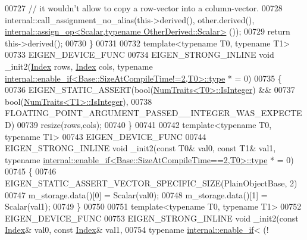 \begin{DoxyCode}
00727       \textcolor{comment}{// it wouldn't allow to copy a row-vector into a column-vector.}
00728       internal::call\_assignment\_no\_alias(this->derived(), other.derived(), 
      \hyperlink{struct_eigen_1_1internal_1_1assign__op}{internal::assign\_op<Scalar,typename OtherDerived::Scalar>}
      ());
00729       \textcolor{keywordflow}{return} this->derived();
00730     \}
00731 
00732     \textcolor{keyword}{template}<\textcolor{keyword}{typename} T0, \textcolor{keyword}{typename} T1>
00733     EIGEN\_DEVICE\_FUNC
00734     EIGEN\_STRONG\_INLINE \textcolor{keywordtype}{void} \_init2(\hyperlink{namespace_eigen_a62e77e0933482dafde8fe197d9a2cfde}{Index} rows, \hyperlink{namespace_eigen_a62e77e0933482dafde8fe197d9a2cfde}{Index} cols, \textcolor{keyword}{typename} 
      \hyperlink{struct_eigen_1_1internal_1_1enable__if}{internal::enable\_if<Base::SizeAtCompileTime!=2,T0>::type}
      * = 0)
00735     \{
00736       EIGEN\_STATIC\_ASSERT(\textcolor{keywordtype}{bool}(\hyperlink{group___core___module_struct_eigen_1_1_num_traits}{NumTraits<T0>::IsInteger}) &&
00737                           \textcolor{keywordtype}{bool}(\hyperlink{group___core___module_struct_eigen_1_1_num_traits}{NumTraits<T1>::IsInteger}),
00738                           FLOATING\_POINT\_ARGUMENT\_PASSED\_\_INTEGER\_WAS\_EXPECTED)
00739       resize(rows,cols);
00740     \}
00741     
00742     \textcolor{keyword}{template}<\textcolor{keyword}{typename} T0, \textcolor{keyword}{typename} T1>
00743     EIGEN\_DEVICE\_FUNC 
00744     EIGEN\_STRONG\_INLINE \textcolor{keywordtype}{void} \_init2(\textcolor{keyword}{const} T0& val0, \textcolor{keyword}{const} T1& val1, \textcolor{keyword}{typename} 
      \hyperlink{struct_eigen_1_1internal_1_1enable__if}{internal::enable\_if<Base::SizeAtCompileTime==2,T0>::type}
      * = 0)
00745     \{
00746       EIGEN\_STATIC\_ASSERT\_VECTOR\_SPECIFIC\_SIZE(PlainObjectBase, 2)
00747       m\_storage.data()[0] = Scalar(val0);
00748       m\_storage.data()[1] = Scalar(val1);
00749     \}
00750     
00751     \textcolor{keyword}{template}<\textcolor{keyword}{typename} T0, \textcolor{keyword}{typename} T1>
00752     EIGEN\_DEVICE\_FUNC 
00753     EIGEN\_STRONG\_INLINE \textcolor{keywordtype}{void} \_init2(\textcolor{keyword}{const} \hyperlink{namespace_eigen_a62e77e0933482dafde8fe197d9a2cfde}{Index}& val0, \textcolor{keyword}{const} \hyperlink{namespace_eigen_a62e77e0933482dafde8fe197d9a2cfde}{Index}& val1,
00754                                     \textcolor{keyword}{typename} \hyperlink{struct_eigen_1_1internal_1_1enable__if}{internal::enable\_if}<    (!

\end{DoxyCode}
